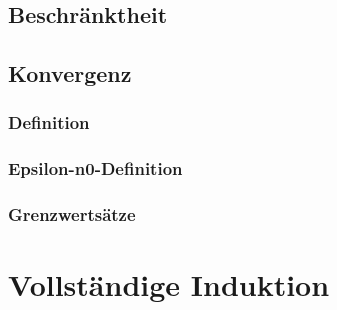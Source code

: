 \subsection{Beschränktheit}

\subsection{Konvergenz}

\subsubsection{Definition}
\subsubsection{Epsilon-n0-Definition}
\subsubsection{Grenzwertsätze}


\section{Vollständige Induktion}
